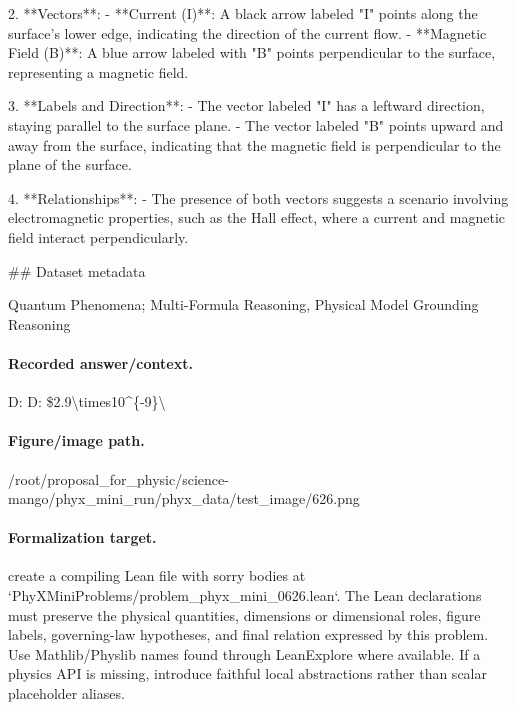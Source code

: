 2. **Vectors**:
   - **Current (I)**: A black arrow labeled "I" points along the surface's lower edge, indicating the direction of the current flow.
   - **Magnetic Field (B)**: A blue arrow labeled with "B" points perpendicular to the surface, representing a magnetic field.

3. **Labels and Direction**:
   - The vector labeled "I" has a leftward direction, staying parallel to the surface plane.
   - The vector labeled "B" points upward and away from the surface, indicating that the magnetic field is perpendicular to the plane of the surface. 

4. **Relationships**:
   - The presence of both vectors suggests a scenario involving electromagnetic properties, such as the Hall effect, where a current and magnetic field interact perpendicularly.

\#\# Dataset metadata

Quantum Phenomena; Multi-Formula Reasoning, Physical Model Grounding Reasoning

\paragraph{Recorded answer/context.}
D: D: \$2.9\textbackslash{}times10\textasciicircum{}\{-9\}\textbackslash{}

\paragraph{Figure/image path.}
/root/proposal\_for\_physic/science-mango/phyx\_mini\_run/phyx\_data/test\_image/626.png

\paragraph{Formalization target.}
create a compiling Lean file with sorry bodies at `PhyXMiniProblems/problem\_phyx\_mini\_0626.lean`. The Lean declarations must preserve the physical quantities, dimensions or dimensional roles, figure labels, governing-law hypotheses, and final relation expressed by this problem.
Use Mathlib/Physlib names found through LeanExplore where available. If a physics API is missing, introduce faithful local abstractions rather than scalar placeholder aliases.

